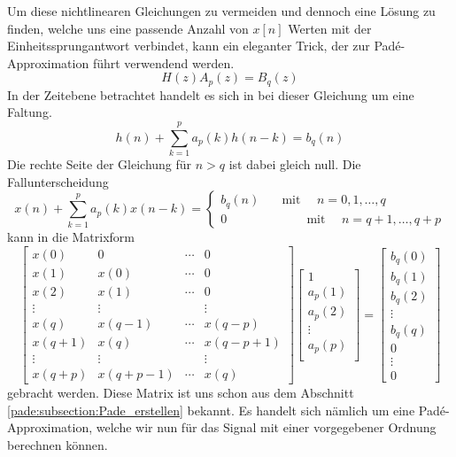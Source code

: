 Um diese nichtlinearen Gleichungen zu vermeiden und dennoch eine Lösung zu finden, welche uns eine passende Anzahl von $x[n]$ Werten mit der Einheitssprungantwort verbindet, kann ein eleganter Trick, der zur Padé-Approximation führt verwendend werden. 
\begin{equation}
H(z) A_{p}(z)=B_{q}(z)
\end{equation}
In der Zeitebene betrachtet handelt es sich in bei dieser Gleichung um eine Faltung.
\begin{equation}
h(n)+\sum_{k=1}^{p} a_{p}(k) h(n-k)=b_{q}(n)
\end{equation}
Die rechte Seite der Gleichung für $n>q$ ist dabei gleich null.
Die Fallunterscheidung
\begin{equation}
x(n)+\sum_{k=1}^{p} a_{p}(k) x(n-k)
=
\left\{\begin{array}{cc}
b_{q}(n) & 
\quad \text{mit } \quad n=0,1, \ldots, q \\
0 & 
\quad \quad \quad\text{mit } \quad n=q+1, \ldots, q+p
\end{array}\right.
\end{equation}
kann in die Matrixform 
\begin{equation}
\left[\begin{array}{cccc}
x(0) & 0 & \cdots & 0 \\
x(1) & x(0) & \cdots & 0 \\
x(2) & x(1) & \cdots & 0 \\
\vdots & \vdots & & \vdots \\
x(q) & x(q-1) & \cdots & x(q-p) \\
x(q+1) & x(q) & \cdots & x(q-p+1) \\
\vdots & \vdots & & \vdots \\
x(q+p) & x(q+p-1) & \cdots & x(q)
\end{array}\right]
\left[\begin{array}{c}
1 \\
a_{p}(1) \\
a_{p}(2) \\
\vdots \\
a_{p}(p) \\
\end{array}\right]
=
\left[\begin{array}{c}
b_{q}(0) \\
b_{q}(1) \\
b_{q}(2) \\
\vdots \\
b_{q}(q) \\
0 \\
\vdots \\
0
\end{array}\right]
\end{equation}
gebracht werden.
Diese Matrix ist uns schon aus dem Abschnitt \ref{pade:subsection:Pade_erstellen} bekannt. Es handelt sich nämlich um eine Padé-Approximation,
welche wir nun für das Signal mit einer vorgegebener Ordnung berechnen können.

